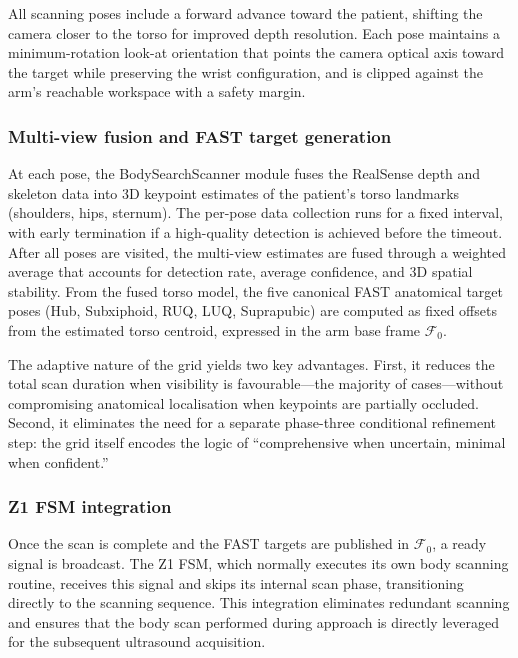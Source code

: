 All scanning poses include a forward advance toward the patient, shifting
the camera closer to the torso for improved depth resolution. Each pose
maintains a minimum-rotation look-at orientation that points the camera
optical axis toward the target while preserving the wrist configuration, and
is clipped against the arm's reachable workspace with a safety margin.

\subsubsection{Multi-view fusion and FAST target generation}

At each pose, the BodySearchScanner module fuses the RealSense depth and
skeleton data into 3D keypoint estimates of the patient's torso landmarks
(shoulders, hips, sternum). The per-pose data collection runs for a fixed
interval, with early termination if a high-quality detection is achieved
before the timeout. After all poses are visited, the multi-view estimates are
fused through a weighted average that accounts for detection rate, average
confidence, and 3D spatial stability. From the fused torso model, the five
canonical FAST anatomical target poses (Hub, Subxiphoid, RUQ, LUQ,
Suprapubic) are computed as fixed offsets from the estimated torso centroid,
expressed in the arm base frame $\mathcal{F}_0$.

The adaptive nature of the grid yields two key advantages. First, it reduces
the total scan duration when visibility is favourable---the majority of
cases---without compromising anatomical localisation when keypoints are
partially occluded. Second, it eliminates the need for a separate phase-three
conditional refinement step: the grid itself encodes the logic of
``comprehensive when uncertain, minimal when confident.''

\subsubsection{Z1 FSM integration}

Once the scan is complete and the FAST targets are published in
$\mathcal{F}_0$, a ready signal is broadcast. The Z1 \ac{FSM}, which normally
executes its own body scanning routine, receives this signal and skips its
internal scan phase, transitioning directly to the scanning sequence. This
integration eliminates redundant scanning and ensures that the body scan
performed during approach is directly leveraged for the subsequent
ultrasound acquisition.

